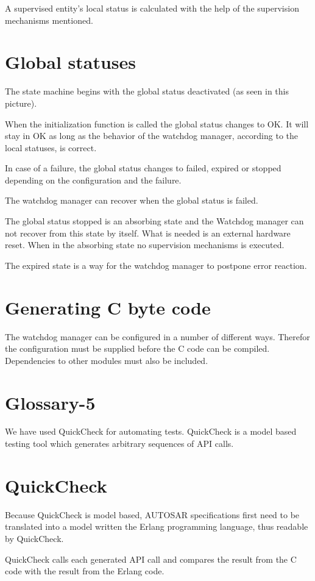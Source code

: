 \documentclass[a4paper]{article}
\begin{document}
A supervised entity's local status is calculated with the help of the
supervision mechanisms mentioned.

\section{Global statuses}
The state machine begins with the global status deactivated (as seen
in this picture).

When the initialization function is called the global status changes
to OK.
It will stay in OK as long as the behavior of the watchdog manager,
according to the local statuses, is correct.

In case of a failure, the global status changes to failed, expired or
stopped depending on the configuration and the failure.

The watchdog manager can recover when the global status is failed.

The global status stopped is an absorbing state and the Watchdog
manager can not recover from this state by itself. What is needed is
an external hardware reset. When in the absorbing state no supervision
mechanisms is executed.

The expired state is a way for the watchdog manager to postpone error
reaction.

\section{Generating C byte code}
The watchdog manager can be configured in a number of different
ways. Therefor the configuration must be supplied before the C code
can be compiled. Dependencies to other modules must also be included.

\section{Glossary-5}
We have used QuickCheck for automating tests. QuickCheck is a model
based testing tool which generates arbitrary sequences of API calls.

\section{QuickCheck}
Because QuickCheck is model based, AUTOSAR specifications first need
to be translated into a model written the Erlang programming language,
thus readable by QuickCheck.

QuickCheck calls each generated API call and compares the result from
the C code with the result from the Erlang code.
\end{document}
